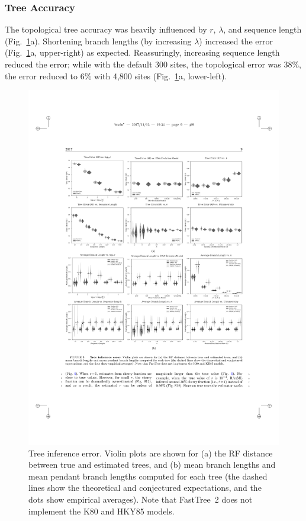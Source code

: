 \subsubsection{Tree Accuracy}
The topological tree accuracy was heavily influenced by $r$, $\lambda$, and sequence length (Fig.~\ref{fig:dualbirth-tree-inference-error}a). Shortening branch lengths (by increasing $\lambda$) increased the error (Fig.~\ref{fig:dualbirth-tree-inference-error}a, upper-right) as expected. Reassuringly, increasing sequence length reduced the error; while with the default 300 sites, the topological error was 38\%, the  error reduced to 6\% with 4,800 sites (Fig.~\ref{fig:dualbirth-tree-inference-error}a, lower-left).

\begin{figure} %
\centering
\includegraphics[width=\textwidth]{figs/dualbirth-tree-inference-error}
\caption[Tree Inference Error]
{Tree inference error. Violin plots are shown for (a) the \gls{RF} distance between true and estimated trees, and (b) mean branch lengths and mean pendant branch lengths computed for each tree (the dashed lines show the theoretical and conjectured expectations, and the dots show empirical averages). Note that FastTree~2 does not implement the \gls{K80} and \gls{HKY85} models.}
\label{fig:dualbirth-tree-inference-error}
\end{figure}

